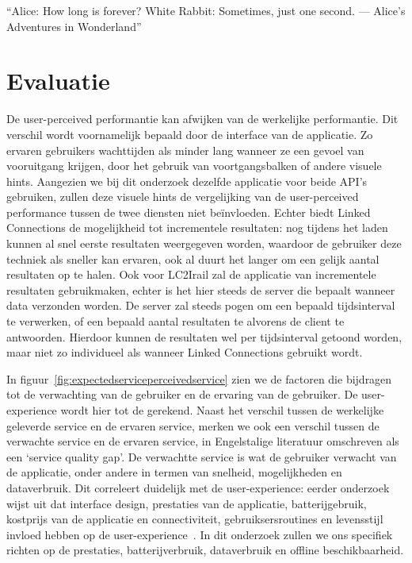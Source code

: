 \begin{savequote}[0.55\linewidth]
	``Alice: How long is forever? White Rabbit: Sometimes, just one second. —  Alice's Adventures in Wonderland''
\end{savequote}

\chapter{Evaluatie}

\label{chap:onderzoek}
De user-perceived performantie kan afwijken van de werkelijke performantie. Dit verschil wordt voornamelijk bepaald door de interface van de applicatie. Zo ervaren gebruikers wachttijden als minder lang wanneer ze een gevoel van vooruitgang krijgen, door het gebruik van voortgangsbalken of andere visuele hints. Aangezien we bij dit onderzoek dezelfde applicatie voor beide API's gebruiken, zullen deze visuele hints de vergelijking van de user-perceived performance tussen de twee diensten niet beïnvloeden. Echter biedt Linked Connections de mogelijkheid tot incrementele resultaten: nog tijdens het laden kunnen al snel eerste resultaten weergegeven worden, waardoor de gebruiker deze techniek als sneller kan ervaren, ook al duurt het langer om een gelijk aantal resultaten op te halen. Ook voor LC2Irail zal de applicatie van incrementele resultaten gebruikmaken, echter is het hier steeds de server die bepaalt wanneer data verzonden worden. De server zal steeds pogen om een bepaald tijdsinterval te verwerken, of een bepaald aantal resultaten te  alvorens de client te antwoorden. Hierdoor kunnen de resultaten wel per tijdsinterval getoond worden, maar niet zo individueel als wanneer Linked Connections gebruikt wordt.

In figuur~\ref{fig:expectedserviceperceivedservice} zien we de factoren die bijdragen tot de verwachting van de gebruiker en de ervaring van de gebruiker. De user-experience wordt hier tot de  gerekend. Naast het verschil tussen de werkelijke geleverde service en de ervaren service, merken we ook een verschil tussen de verwachte service en de ervaren service, in Engelstalige literatuur omschreven als een `service quality gap'. De verwachtte service is wat de gebruiker verwacht van de applicatie, onder andere in termen van snelheid, mogelijkheden en dataverbruik. Dit correleert duidelijk met de user-experience: eerder onderzoek wijst uit dat interface design, prestaties van de applicatie, batterijgebruik, kostprijs van de applicatie en connectiviteit, gebruiksersroutines en levensstijl invloed hebben op de user-experience~\citep{ickin12}. In dit onderzoek zullen we ons specifiek richten op de prestaties, batterijverbruik, dataverbruik en offline beschikbaarheid.

